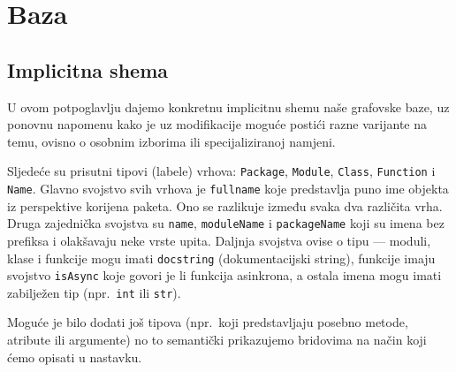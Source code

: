 \section{Baza}

\subsection{Implicitna shema} \label{subsec:implicitna}
U ovom potpoglavlju dajemo konkretnu implicitnu shemu naše grafovske baze,
uz ponovnu napomenu kako je uz modifikacije moguće postići razne varijante na temu,
ovisno o osobnim izborima ili specijaliziranoj namjeni.

Sljedeće su prisutni tipovi (labele) vrhova: \texttt{Package},
\texttt{Module}, \texttt{Class}, \texttt{Function} i \texttt{Name}.
Glavno svojstvo svih vrhova je \texttt{fullname} koje predstavlja
puno ime objekta iz perspektive korijena paketa. Ono se razlikuje između
svaka dva različita vrha. Druga zajednička svojstva su \texttt{name},
\texttt{moduleName} i \texttt{packageName} koji su imena
bez prefiksa i olakšavaju neke vrste upita. Daljnja svojstva ovise o
tipu --- moduli, klase i funkcije mogu imati \texttt{docstring} (dokumentacijski string),
funkcije imaju svojstvo \texttt{isAsync} koje govori je li funkcija asinkrona, a
ostala imena mogu imati zabilježen tip (npr.\ \texttt{int} ili \texttt{str}).

Moguće je bilo dodati još tipova (npr.\ koji predstavljaju posebno metode,
atribute ili argumente) no to semantički prikazujemo bridovima na način koji ćemo opisati
u nastavku.


